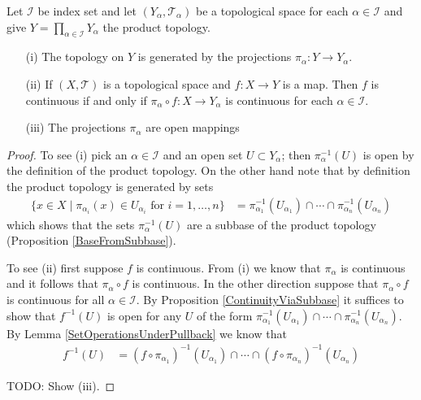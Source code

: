 \begin{prop}\label{ProductTopologyProperties}Let $\mathcal{I}$ be index set  and let $(Y_\alpha,  \mathcal{T}_\alpha)$ be a topological space for each $\alpha \in \mathcal{I}$ and give $Y = \prod_{\alpha \in \mathcal{I}} Y_\alpha$ the product topology. 
\begin{itemize}
\item[(i)] The topology on $Y$ is generated by the projections $\pi_\alpha : Y \to Y_\alpha$.
\item[(ii)] If $(X, \mathcal{T})$ is a topological space and $f : X \to Y$ is a map. Then $f$ is continuous if and only if $\pi_\alpha \circ f : X \to Y_\alpha$ is
continuous for each $\alpha \in \mathcal{I}$.
\item[(iii)] The projections $\pi_\alpha$ are open mappings
\end{itemize}
\end{prop}
\begin{proof}
To see (i) pick an $\alpha \in \mathcal{I}$ and an open set $U \subset Y_\alpha$; then $\pi_\alpha^{-1}(U)$ is open by the definition of the product topology.  On the other hand note that by definition
the product topology is generated by sets 
\begin{align*}
\lbrace x \in X \mid \pi_{\alpha_i}(x) \in U_{\alpha_i} \text{ for $i=1, \dotsc, n$} \rbrace &= \pi_{\alpha_1}^{-1}(U_{\alpha_1}) \cap \dotsb \cap \pi_{\alpha_n}^{-1}(U_{\alpha_n})
\end{align*}
which shows that the sets $\pi_\alpha^{-1}(U)$ are a subbase of the product topology (Proposition \ref{BaseFromSubbase}).

To see (ii) first suppose $f$ is continuous.  From (i) we know that $\pi_\alpha$ is continuous and it follows that $\pi_\alpha \circ f$ is continuous.  In the other direction suppose that $\pi_\alpha \circ f$ is continuous for all $\alpha \in \mathcal{I}$.  By Proposition \ref{ContinuityViaSubbase} it suffices to show that $f^{-1}(U)$ is open for any $U$ of the form $\pi_{\alpha_1}^{-1}(U_{\alpha_1}) \cap \dotsb \cap \pi_{\alpha_n}^{-1}(U_{\alpha_n})$.  By Lemma \ref{SetOperationsUnderPullback} we know that 
\begin{align*}
f^{-1}(U) &= (f \circ \pi_{\alpha_1})^{-1}(U_{\alpha_1}) \cap \dotsb \cap (f \circ \pi_{\alpha_n})^{-1}(U_{\alpha_n})
\end{align*}

TODO: Show (iii).
\end{proof}

